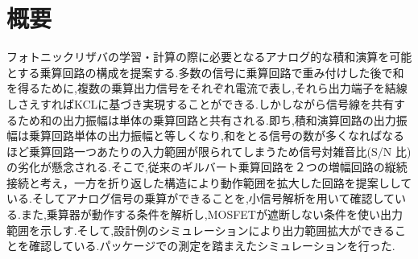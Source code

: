 \chapter*{概要}
フォトニックリザバの学習・計算の際に必要となるアナログ的な積和演算を可能とする乗算回路の構成を提案する.多数の信号に乗算回路で重み付けした後で和を得るために,複数の乗算出力信号をそれぞれ電流で表し,それら出力端子を結線しさえすればKCLに基づき実現することができる.しかしながら信号線を共有するため和の出力振幅は単体の乗算回路と共有される.即ち,積和演算回路の出力振幅は乗算回路単体の出力振幅と等しくなり,和をとる信号の数が多くなればなるほど乗算回路一つあたりの入力範囲が限られてしまうため信号対雑音比(S/N 比)の劣化が懸念される.そこで,従来のギルバート乗算回路を２つの増幅回路の縦続接続と考え，一方を折り返した構造により動作範囲を拡大した回路を提案ししている.そしてアナログ信号の乗算ができることを,小信号解析を用いて確認している.また,乗算器が動作する条件を解析し,MOSFETが遮断しない条件を使い出力範囲を示しす.そして,設計例のシミュレーションにより出力範囲拡大ができることを確認している.パッケージでの測定を踏まえたシミュレーションを行った.
